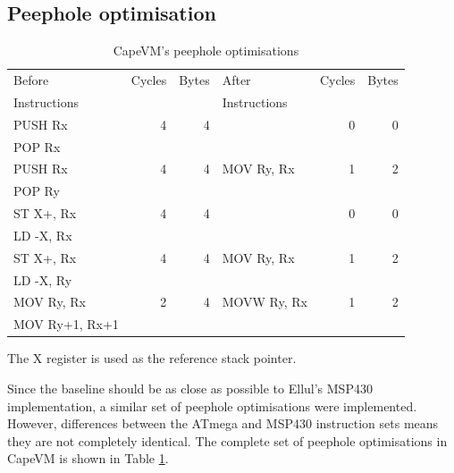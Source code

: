 \subsection{Peephole optimisation}
\begin{table}
\caption{CapeVM's peephole optimisations}
\label{tbl-CapeVM-peephole}
    \begin{threeparttable}
    \begin{tabular}{lrrlrr} %
    \toprule
    Before         & Cycles & Bytes   & After        & Cycles & Bytes   \\
    Instructions   &        &         & Instructions &        &         \\
    \midrule
    \midrule
    PUSH Rx        & 4      & 4       &              & 0      & 0 \\
    POP Rx         &        &         &              &        & \\
    \midrule
    PUSH Rx        & 4      & 4       & MOV Ry, Rx   & 1      & 2 \\
    POP Ry         &        &         &              &        & \\
    \midrule
    ST X+, Rx      & 4      & 4       &              & 0      & 0 \\
    LD -X, Rx      &        &         &              &        & \\
    \midrule
    ST X+, Rx      & 4      & 4       & MOV Ry, Rx   & 1      & 2 \\
    LD -X, Ry      &        &         &              &        & \\
    \midrule
    MOV Ry, Rx     & 2      & 4       & MOVW Ry, Rx  & 1      & 2 \\
    MOV Ry+1, Rx+1 &        &         &              &        & \\
    \bottomrule
    \end{tabular}
    \begin{tablenotes}
    \item The X register is used as the reference stack pointer.
    \end{tablenotes}
    \end{threeparttable}
\end{table}

Since the baseline should be as close as possible to Ellul's MSP430 implementation, a similar set of peephole optimisations were implemented. However, differences between the ATmega and MSP430 instruction sets means they are not completely identical. The complete set of peephole optimisations in CapeVM is shown in Table \ref{tbl-CapeVM-peephole}.

